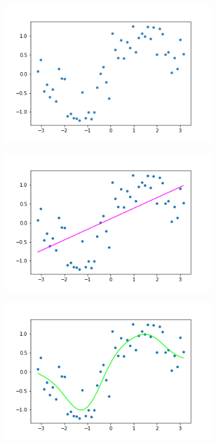 \documentclass[a4paper,11pt,twoside]{article}
\begin{document}
\begin{figure} [h!]
\centering
  \begin{subfigure}[b]{0.47\textwidth}
    \includegraphics[width=\textwidth]{wavey.png}
    \caption{}
    \label{fig:1}
  \end{subfigure}
  \begin{subfigure}[b]{0.47\textwidth}
    \includegraphics[width=\textwidth]{wavey_lr.png}
    \caption{}
    \label{fig:2}
  \end{subfigure}
  \begin{subfigure}[b]{0.47\textwidth}
    \includegraphics[width=\textwidth]{wavey_kr.png}

\end{subfigure}
\end{figure}
\end{document}
